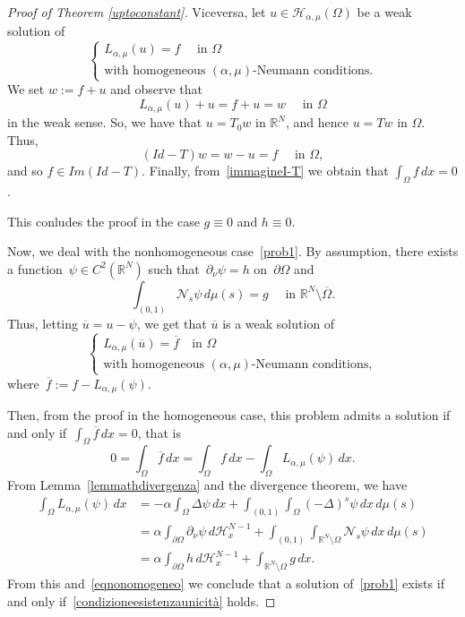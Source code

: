 \documentclass[12pt,a4paper,intlimits,sumlimits]{amsart}
\def \R {\mathbb{R}}
\def \Ns {\mathscr{N}_{s}}
\theoremstyle{definition}
\theoremstyle{plain}
\numberwithin{equation}{section}
\begin{document}
\begin{appendix}
\begin{proof}[Proof of Theorem \ref{uptoconstant}]
Viceversa, let $u\in \mathcal{H}_{\alpha,\mu}(\Omega)$ be a weak 
solution of 
\[
\begin{cases}
L_{\alpha,\mu}(u)=f  \quad \mbox{ in } \Omega
\\
\mbox{with homogeneous } (\alpha,\mu)\mbox{-Neumann conditions}.
\end{cases}
\]
We set $w:=f+u$ and observe that
\[
L_{\alpha,\mu}(u)+u=f+u=w \quad\mbox{ in }\Omega
\]
in the weak sense. So, we have that $u=T_0 w$ in $\R^N$, and
hence $u=Tw$ in $\Omega$. Thus,
\[
(Id-T)w=w-u=f  \quad\mbox{ in }\Omega,
\]
and so $f\in Im(Id-T)$. Finally, from~\eqref{immagineI-T} we 
obtain that $\int_\Omega f\,dx=0$.

This conludes the proof in the case $g\equiv 0$ and $h\equiv 0$.

Now, we deal with the nonhomogeneous case~\eqref{prob1}.
By assumption, there exists a function~$\psi \in C^2(\R^N)$ 
such that~$\partial_\nu \psi =h$ on~$\partial \Omega$ and
\[
\int_{(0, 1)}\Ns \psi \,d\mu(s)=g\quad \mbox{ in } \R^N\setminus\overline{\Omega}.
\]
Thus, letting $\overline{u}=u-\psi$, we get that $\overline{u}$
is a weak solution of
\[
\begin{cases}
L_{\alpha,\mu}(\overline{u})=\overline{f}  \quad \mbox{in } \Omega
\\
\mbox{with homogeneous } (\alpha,\mu)\mbox{-Neumann conditions},
\end{cases}
\]
where~$\overline{f} :=f-L_{\alpha,\mu}(\psi)$.

Then, from the proof in the homogeneous case, this problem admits
a solution if and only if~$\int_\Omega \overline{f}\,dx=0$, 
that is 
\begin{equation}\label{eqnonomogeneo}
0=\int_\Omega \overline{f}\,dx
=\int_\Omega f\,dx -\int_\Omega  L_{\alpha,\mu}(\psi)\,dx.
\end{equation}
{F}rom Lemma~\ref{lemmathdivergenza} and the divergence theorem,
we have
\[
\begin{aligned}
\int_\Omega  L_{\alpha,\mu}(\psi)\,dx
&=-\alpha\int_\Omega \Delta \psi\,dx
+\int_{(0, 1)}\int_\Omega (-\Delta)^s \psi\,dx\,d\mu(s) \\
&=\alpha\int_{\partial\Omega} \partial_\nu  \psi\,d\mathscr{H}_x^{N-1}
+\int_{(0, 1)}\int_{\R^N\setminus \Omega }
\Ns \psi \,dx \,d\mu(s) \\
&=\alpha\int_{\partial\Omega} h\,d\mathscr{H}_x^{N-1}
+\int_{\R^N\setminus \Omega } g\,dx.
\end{aligned}
\]
{F}rom this and~\eqref{eqnonomogeneo} we conclude that a solution of~\eqref{prob1}
exists if and only if~\eqref{condizioneesistenzaunicità} holds.


\end{proof}
\end{appendix}
\end{document}
